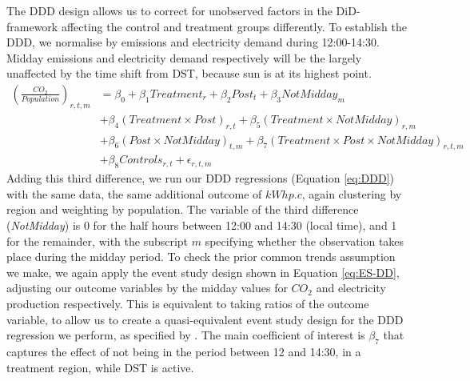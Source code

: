 The DDD design allows us to correct for unobserved factors in the \ac{DiD}-framework affecting the control and treatment groups differently. To establish the \ac{DDD}, we normalise by emissions and electricity demand during 12:00-14:30. Midday emissions and electricity demand respectively will be the largely unaffected by the time shift from DST, because sun is at its highest point. 
\begin{align}
    \label{eq:DDD}
    \left(\frac{CO_2}{Population}\right)_{r,t,m} &= \beta_0 + \beta_1Treatment_{r} + \beta_2Post_{t} + \beta_3NotMidday_{m}   \\
    & +\beta_4(Treatment \times Post)_{r,t} + 
    \beta_5(Treatment \times NotMidday)_{r,m} \nonumber \\ 
    & +\beta_6(Post \times NotMidday)_{t,m} + \beta_7 (Treatment \times Post \times NotMidday)_{r,t,m} \nonumber \\ 
    &+ \beta_8 Controls_{r,t}  + \epsilon_{r,t,m}
    \nonumber 
\end{align}
Adding this third difference, we run our DDD regressions (Equation \ref{eq:DDD}) with the same data, the same additional outcome of $kWh p.c$, again clustering by region and weighting by population. The variable of the third difference (\textit{NotMidday}) is 0 for the half hours between 12:00 and 14:30 (local time), and 1 for the remainder, with the subscript $m$ specifying whether the observation takes place during the midday period.
To check the prior common trends assumption we make, we again apply the event study design shown in Equation \ref{eq:ES-DD}, adjusting our outcome variables by the midday values for $CO_2$ and electricity production respectively. This is equivalent to taking ratios of the outcome variable, to allow us to create a quasi-equivalent event study design for the \ac{DDD} regression we perform, as specified by \textcite{olden_triple_2022}. The main coefficient of interest is $\beta_7$ that captures the effect of not being in the period between 12 and 14:30, in a treatment region, while \ac{DST} is active.

